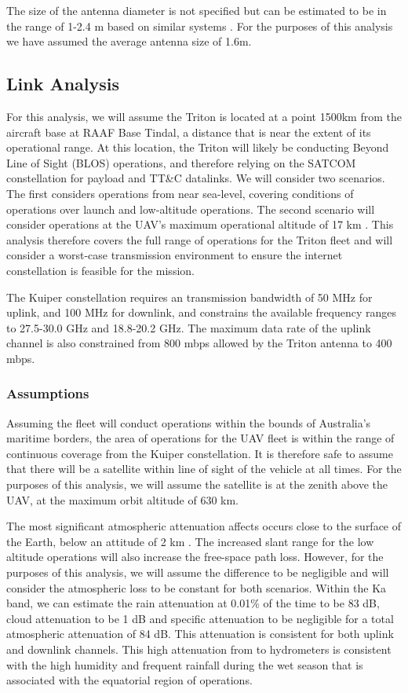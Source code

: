 \documentclass[12pt]{article}
\begin{document}
The size of the antenna diameter is not specified but can be estimated to be in the range of 1-2.4 m based on similar systems \cite{pachler}. For the purposes of this analysis we have assumed the average antenna size of 1.6m. 


\subsection{Link Analysis}
 For this analysis, we will assume the Triton is located at a point 1500km from the aircraft base at RAAF Base Tindal, a distance that is near the extent of its operational range. At this location, the Triton will likely be conducting Beyond Line of Sight (BLOS) operations, and therefore relying on the SATCOM constellation for payload and TT\&C datalinks. We will consider two scenarios. The first considers operations from near sea-level, covering conditions of operations over launch and low-altitude operations. The second scenario will consider operations at the UAV's maximum operational altitude of 17 km \cite{navyrecognition}.  This analysis therefore covers the full range of operations for the Triton fleet and will consider a worst-case transmission environment to ensure the internet constellation is feasible for the mission. 
 
 The Kuiper constellation requires an transmission bandwidth of 50 MHz for uplink, and 100 MHz for downlink, and constrains the available frequency ranges to 27.5-30.0 GHz and 18.8-20.2 GHz. The maximum data rate of the uplink channel is also constrained from 800 mbps allowed by the Triton antenna to 400 mbps. 

\subsubsection{Assumptions}
Assuming the fleet will conduct operations within the bounds of Australia's maritime borders, the area of operations for the UAV fleet is within the range of continuous coverage from the Kuiper constellation. It is therefore safe to assume that there will be a satellite within line of sight of the vehicle at all times. For the purposes of this analysis, we will assume the satellite is at the zenith above the UAV, at the maximum orbit altitude of 630 km. 

The most significant atmospheric attenuation affects occurs close to the surface of the Earth, below an attitude of 2 km \cite{elecnotes}. The increased slant range for the low altitude operations will also increase the free-space path loss. However, for the purposes of this analysis, we will assume the difference to be negligible and will consider the atmospheric loss to be constant for both scenarios. Within the Ka band, we can estimate the rain attenuation at 0.01\% of the time to be 83 dB, cloud attenuation to be 1 dB and specific attenuation to be negligible\cite{alsaegh} for a total atmospheric attenuation of 84 dB. This attenuation is consistent for both uplink and downlink channels. This high attenuation from to hydrometers is consistent with the high humidity and frequent rainfall during the wet season that is associated with the equatorial region of operations.
\end{document}

